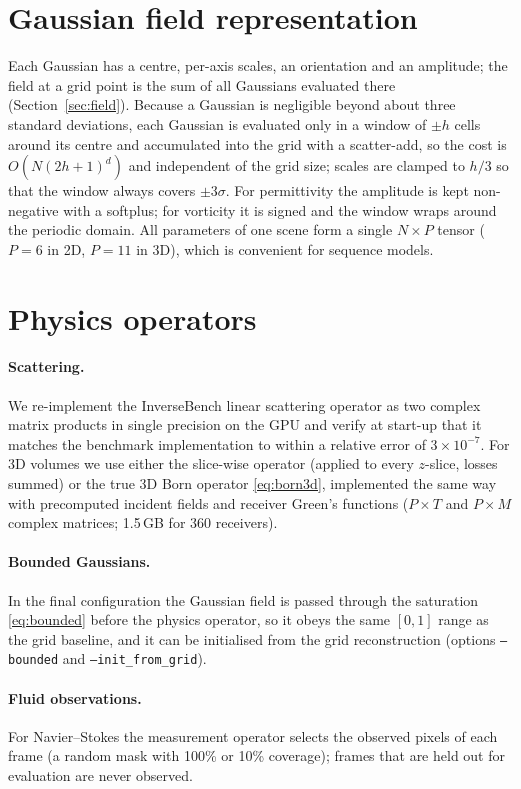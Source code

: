 \section{Gaussian field representation}
Each Gaussian has a centre, per-axis scales, an orientation and an amplitude; the field at a grid point is the sum of
all Gaussians evaluated there (Section~\ref{sec:field}). Because a Gaussian is negligible beyond about three standard
deviations, each Gaussian is evaluated only in a window of $\pm h$ cells around its centre and accumulated into the
grid with a scatter-add, so the cost is $O(N(2h+1)^d)$ and independent of the grid size; scales are clamped to
$h/3$ so that the window always covers $\pm3\sigma$. For permittivity the amplitude is kept non-negative with a
softplus; for vorticity it is signed and the window wraps around the periodic domain. All parameters of one scene form
a single $N\times P$ tensor ($P=6$ in 2D, $P=11$ in 3D), which is convenient for sequence models.

\section{Physics operators}
\paragraph{Scattering.} We re-implement the InverseBench linear scattering operator as two complex matrix products
in single precision on the GPU and verify at start-up that it matches the benchmark implementation to within a relative
error of $3\times10^{-7}$. For 3D volumes we use either the slice-wise operator (applied to every $z$-slice, losses summed) or the true 3D
Born operator \eqref{eq:born3d}, implemented the same way with precomputed incident fields and
receiver Green's functions ($P\times T$ and $P\times M$ complex matrices; 1.5\,GB for 360 receivers).
\paragraph{Bounded Gaussians.} In the final configuration the Gaussian field is passed through the saturation
\eqref{eq:bounded} before the physics operator, so it obeys the same $[0,1]$ range as the grid baseline, and it can be
initialised from the grid reconstruction (options \texttt{--bounded} and \texttt{--init\_from\_grid}).
\paragraph{Fluid observations.} For Navier--Stokes the measurement operator selects the observed pixels of each frame
(a random mask with 100\% or 10\% coverage); frames that are held out for evaluation are never observed.

